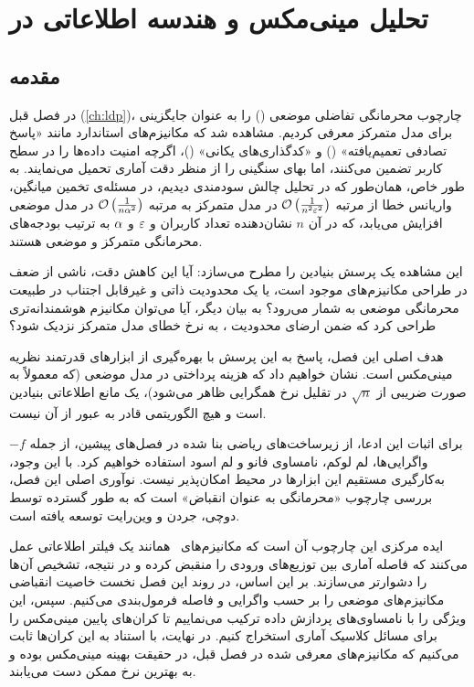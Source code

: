 \chapter{تحلیل مینی‌مکس و هندسه اطلاعاتی در }
\label{ch:minimax-theory}

\section{مقدمه}
\label{sec:minimax:intro}
در فصل قبل (\ref{ch:ldp})، چارچوب محرمانگی تفاضلی موضعی () را به عنوان جایگزینی برای مدل متمرکز معرفی کردیم. مشاهده شد که مکانیزم‌های استاندارد مانند «پاسخ تصادفی تعمیم‌یافته» () و «کدگذاری‌های یکانی» ()، اگرچه امنیت داده‌ها را در سطح کاربر تضمین می‌کنند، اما بهای سنگینی را از منظر دقت آماری تحمیل می‌نمایند. به طور خاص، همان‌طور که در تحلیل چالش سودمندی دیدیم، در مسئله‌ی تخمین میانگین، واریانس خطا از مرتبه $\mathcal{O}\left( \frac{1}{n^2\varepsilon^2} \right)$ در مدل متمرکز به مرتبه $\mathcal{O}\left( \frac{1}{n\alpha^2} \right)$ در مدل موضعی افزایش می‌یابد، که در آن $n$ نشان‌دهنده تعداد کاربران و $\varepsilon$ و $\alpha$ به ترتیب بودجه‌های محرمانگی متمرکز و موضعی هستند.

این مشاهده یک پرسش بنیادین را مطرح می‌سازد: آیا این کاهش دقت، ناشی از ضعف در طراحی مکانیزم‌های موجود است، یا یک محدودیت ذاتی و غیرقابل اجتناب در طبیعت محرمانگی موضعی به شمار می‌رود؟ به بیان دیگر، آیا می‌توان مکانیزم هوشمندانه‌تری طراحی کرد که ضمن ارضای محدودیت ، به نرخ خطای مدل متمرکز نزدیک شود؟

هدف اصلی این فصل، پاسخ به این پرسش با بهره‌گیری از ابزارهای قدرتمند نظریه مینی‌مکس است. نشان خواهیم داد که هزینه پرداختی در مدل موضعی (که معمولاً به صورت ضریبی از $\sqrt{n}$ در تقلیل نرخ همگرایی ظاهر می‌شود)، یک مانع اطلاعاتی بنیادین است و هیچ الگوریتمی قادر به عبور از آن نیست.

برای اثبات این ادعا، از زیرساخت‌های ریاضی بنا شده در فصل‌های پیشین، از جمله $-f$واگرایی‌ها، لم لوکم، نامساوی فانو و لم اسود استفاده خواهیم کرد. با این وجود، به‌کارگیری مستقیم این ابزارها در محیط  امکان‌پذیر نیست. نوآوری اصلی این فصل، بررسی چارچوب «محرمانگی به عنوان انقباض» است که به طور گسترده توسط دوچی، جردن و وین‌رایت \cite{Duchi2013, duchi2018} توسعه یافته است.

ایده مرکزی این چارچوب آن است که مکانیزم‌های \LDP\ همانند یک فیلتر اطلاعاتی عمل می‌کنند که فاصله آماری بین توزیع‌های ورودی را منقبض کرده و در نتیجه، تشخیص آن‌ها را دشوارتر می‌سازند. بر این اساس، در روند این فصل نخست خاصیت انقباضی مکانیزم‌های موضعی را بر حسب واگرایی  و فاصله  فرمول‌بندی می‌کنیم. سپس، این ویژگی را با نامساوی‌های پردازش داده ترکیب می‌نماییم تا کران‌های پایین مینی‌مکس را برای مسائل کلاسیک آماری استخراج کنیم. در نهایت، با استناد به این کران‌ها ثابت می‌کنیم که مکانیزم‌های معرفی شده در فصل قبل، در حقیقت بهینه مینی‌مکس بوده و به بهترین نرخ ممکن دست می‌یابند.

